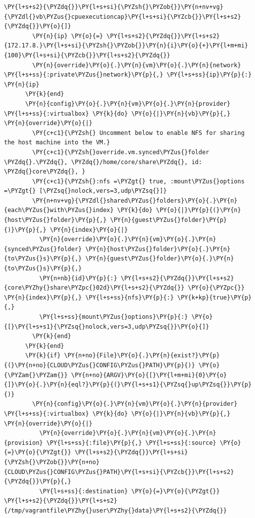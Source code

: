 \begin{codelisting}
\begin{Verbatim}[fontsize=\relsize{-2.5},fontseries=b,commandchars=\\\{\}]
                      \PY{l+s+s2}{\PYZdq{}}\PY{l+s+si}{\PYZsh{}\PYZob{}}\PY{n+nv+vg}{\PYZdl{}vb\PYZus{}cpuexecutioncap}\PY{l+s+si}{\PYZcb{}}\PY{l+s+s2}{\PYZdq{}}\PY{o}{]}
        \PY{n}{ip} \PY{o}{=} \PY{l+s+s2}{\PYZdq{}}\PY{l+s+s2}{172.17.8.}\PY{l+s+si}{\PYZsh{}\PYZob{}}\PY{n}{i}\PY{o}{+}\PY{l+m+mi}{100}\PY{l+s+si}{\PYZcb{}}\PY{l+s+s2}{\PYZdq{}}
        \PY{n}{override}\PY{o}{.}\PY{n}{vm}\PY{o}{.}\PY{n}{network} \PY{l+s+ss}{:private\PYZus{}network}\PY{p}{,} \PY{l+s+ss}{ip}\PY{p}{:} \PY{n}{ip}
      \PY{k}{end}
      \PY{n}{config}\PY{o}{.}\PY{n}{vm}\PY{o}{.}\PY{n}{provider} \PY{l+s+ss}{:virtualbox} \PY{k}{do} \PY{o}{|}\PY{n}{vb}\PY{p}{,} \PY{n}{override}\PY{o}{|}
        \PY{c+c1}{\PYZsh{} Uncomment below to enable NFS for sharing the host machine into the VM.}
        \PY{c+c1}{\PYZsh{}override.vm.synced\PYZus{}folder \PYZdq{}.\PYZdq{}, \PYZdq{}/home/core/share\PYZdq{}, id: \PYZdq{}core\PYZdq{}, }
        \PY{c+c1}{\PYZsh{}:nfs =\PYZgt{} true, :mount\PYZus{}options =\PYZgt{} [\PYZsq{}nolock,vers=3,udp\PYZsq{}]}
        \PY{n+nv+vg}{\PYZdl{}shared\PYZus{}folders}\PY{o}{.}\PY{n}{each\PYZus{}with\PYZus{}index} \PY{k}{do} \PY{o}{|}\PY{p}{(}\PY{n}{host\PYZus{}folder}\PY{p}{,} \PY{n}{guest\PYZus{}folder}\PY{p}{)}\PY{p}{,} \PY{n}{index}\PY{o}{|}
          \PY{n}{override}\PY{o}{.}\PY{n}{vm}\PY{o}{.}\PY{n}{synced\PYZus{}folder} \PY{n}{host\PYZus{}folder}\PY{o}{.}\PY{n}{to\PYZus{}s}\PY{p}{,} \PY{n}{guest\PYZus{}folder}\PY{o}{.}\PY{n}{to\PYZus{}s}\PY{p}{,} 
          \PY{n+nb}{id}\PY{p}{:} \PY{l+s+s2}{\PYZdq{}}\PY{l+s+s2}{core\PYZhy{}share\PYZpc{}02d}\PY{l+s+s2}{\PYZdq{}} \PY{o}{\PYZpc{}} \PY{n}{index}\PY{p}{,} \PY{l+s+ss}{nfs}\PY{p}{:} \PY{k+kp}{true}\PY{p}{,} 
          \PY{l+s+ss}{mount\PYZus{}options}\PY{p}{:} \PY{o}{[}\PY{l+s+s1}{\PYZsq{}nolock,vers=3,udp\PYZsq{}}\PY{o}{]}
        \PY{k}{end}
      \PY{k}{end}
      \PY{k}{if} \PY{n+no}{File}\PY{o}{.}\PY{n}{exist?}\PY{p}{(}\PY{n+no}{CLOUD\PYZus{}CONFIG\PYZus{}PATH}\PY{p}{)} \PY{o}{\PYZam{}\PYZam{}} \PY{n+no}{ARGV}\PY{o}{[}\PY{l+m+mi}{0}\PY{o}{]}\PY{o}{.}\PY{n}{eql?}\PY{p}{(}\PY{l+s+s1}{\PYZsq{}up\PYZsq{}}\PY{p}{)}
        \PY{n}{config}\PY{o}{.}\PY{n}{vm}\PY{o}{.}\PY{n}{provider} \PY{l+s+ss}{:virtualbox} \PY{k}{do} \PY{o}{|}\PY{n}{vb}\PY{p}{,} \PY{n}{override}\PY{o}{|}
          \PY{n}{override}\PY{o}{.}\PY{n}{vm}\PY{o}{.}\PY{n}{provision} \PY{l+s+ss}{:file}\PY{p}{,} \PY{l+s+ss}{:source} \PY{o}{=}\PY{o}{\PYZgt{}} \PY{l+s+s2}{\PYZdq{}}\PY{l+s+si}{\PYZsh{}\PYZob{}}\PY{n+no}{CLOUD\PYZus{}CONFIG\PYZus{}PATH}\PY{l+s+si}{\PYZcb{}}\PY{l+s+s2}{\PYZdq{}}\PY{p}{,} 
          \PY{l+s+ss}{:destination} \PY{o}{=}\PY{o}{\PYZgt{}} \PY{l+s+s2}{\PYZdq{}}\PY{l+s+s2}{/tmp/vagrantfile\PYZhy{}user\PYZhy{}data}\PY{l+s+s2}{\PYZdq{}}

\end{Verbatim}
\end{codelisting}
